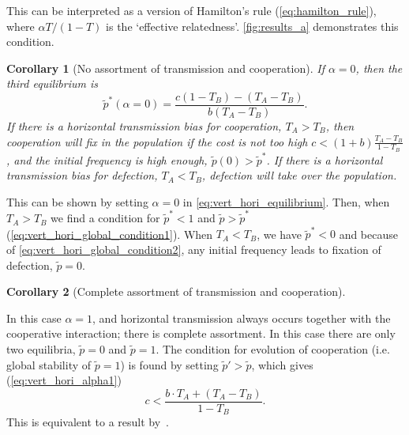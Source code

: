 \documentclass[12pt]{extarticle}
\newtheorem{corollary}{Corollary}
\begin{document}
This can be interpreted as a version of Hamilton's rule (\autoref{eq:hamilton_rule}), where $\alpha T/(1-T)$ is the `effective relatedness'.
\autoref{fig:results_a} demonstrates this condition. 
\\

\begin{corollary}[No assortment of transmission and cooperation]
If $\alpha=0$, then the third equilibrium is
\begin{equation} \label{eq:vert_hori_alpha0_equilibrium}
\tilde{p}^*(\alpha=0) = \frac{c(1-T_B) - (T_A-T_B)}{b (T_A-T_B) }.
\end{equation} 
If there is a horizontal transmission bias for cooperation, $T_A>T_B$, then cooperation will fix in the population if the cost is not too high $c < (1+b) \frac{T_A-T_B}{1-T_B}$, and the initial frequency is high enough, $\tilde{p}(0) > \tilde{p}^*$.
If there is a horizontal transmission bias for defection, $T_A<T_B$, defection will take over the population.
\end{corollary}

This can be shown by setting $\alpha=0$ in \autoref{eq:vert_hori_equilibrium}. 
Then, when $T_A>T_B$ we find a condition for $\tilde{p}^*<1$ and $\tilde{p}>\tilde{p}^*$ (\autoref{eq:vert_hori_global_condition1}). When $T_A<T_B$, we have $\tilde{p}^*<0$ and because of \autoref{eq:vert_hori_global_condition2}, any initial frequency leads to fixation of defection, $\tilde{p}=0$.\\

\begin{corollary}[Complete assortment of transmission and cooperation]
\end{corollary}
In this case $\alpha=1$, and horizontal transmission always occurs together with the cooperative interaction; there is complete assortment.
In this case there are only two equilibria, $\tilde{p}=0$ and $\tilde{p}=1$.
The condition for evolution of cooperation (i.e. global stability of $\tilde{p}=1$) is found by setting $\tilde{p}'>\tilde{p}$, which gives (\autoref{eq:vert_hori_alpha1})
\begin{equation}\label{eq:vert_hori_alpha1}
c < \frac{b \cdot T_A + (T_A - T_B)}{1-T_B}.
\end{equation}
This is equivalent to a result by~\citet[eq.~1]{lewin2017microbes}.
\end{document}
